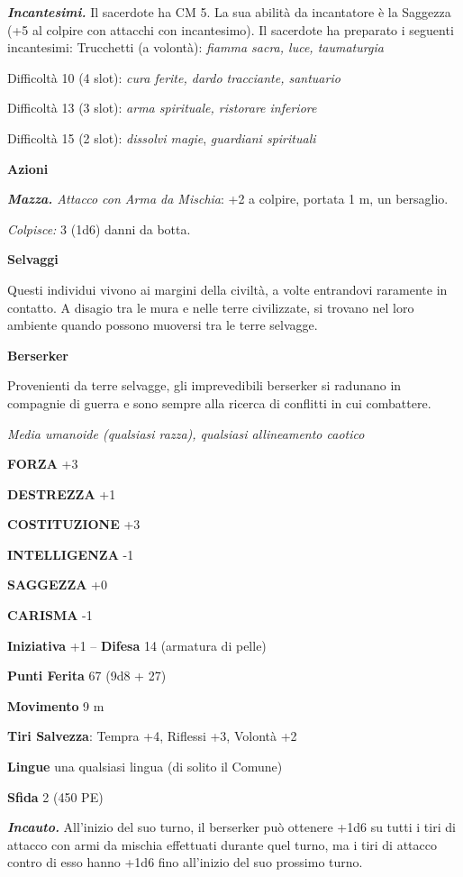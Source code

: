 \begin{multicols}{2}
\emph{\textbf{Incantesimi.}} Il sacerdote ha CM 5. La sua abilità da incantatore è la Saggezza (+5 al colpire con attacchi con incantesimo). Il sacerdote ha preparato i seguenti incantesimi: Trucchetti (a volontà): \emph{fiamma sacra, luce, taumaturgia}

Difficoltà 10 (4 slot): \emph{cura ferite, dardo tracciante, santuario}

Difficoltà 13 (3 slot): \emph{arma spirituale, ristorare inferiore}

Difficoltà 15 (2 slot): \emph{dissolvi magie}, \emph{guardiani spirituali}

\textbf{Azioni}

\emph{\textbf{Mazza.} Attacco con Arma da Mischia}: +2 a colpire, portata 1 m, un bersaglio.

\emph{Colpisce:} 3 (1d6) danni da botta.


\medskip\textbf{Selvaggi}

Questi individui vivono ai margini della civiltà, a volte entrandovi raramente in contatto. A disagio tra le mura e nelle terre civilizzate, si trovano nel loro ambiente quando possono muoversi tra le terre selvagge.

\medskip\textbf{Berserker}

Provenienti da terre selvagge, gli imprevedibili berserker si radunano in compagnie di guerra e sono sempre alla ricerca di conflitti in cui combattere.

\emph{Media umanoide (qualsiasi razza), qualsiasi allineamento caotico}

\textbf{FORZA} +3

\textbf{DESTREZZA} +1

\textbf{COSTITUZIONE} +3

\textbf{INTELLIGENZA} -1

\textbf{SAGGEZZA} +0

\textbf{CARISMA} -1

\textbf{Iniziativa} +1 -- \textbf{Difesa} 14 (armatura di pelle)

\textbf{Punti Ferita} 67 (9d8 + 27)

\textbf{Movimento} 9 m

\textbf{Tiri Salvezza}: Tempra +4, Riflessi +3, Volontà +2 

\textbf{Lingue} una qualsiasi lingua (di solito il Comune)

\textbf{Sfida} 2 (450 PE)

\emph{\textbf{Incauto.}} All'inizio del suo turno, il berserker può ottenere +1d6 su tutti i tiri di attacco con armi da mischia effettuati durante quel turno, ma i tiri di attacco contro di esso hanno
+1d6 fino all'inizio del suo prossimo turno.


\end{multicols}

